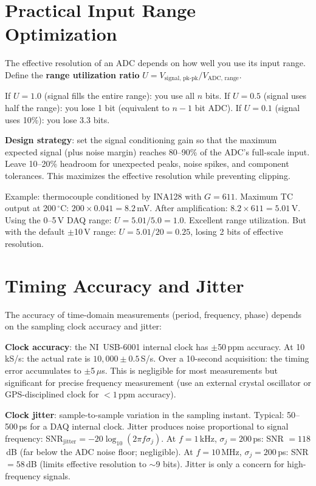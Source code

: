 \documentclass[11pt,letterpaper,twoside,openany]{book}
\newcommand{\degC}{\ensuremath{{}^{\circ}\text{C}}}
\begin{document}
\section{Practical Input Range Optimization}
The effective resolution of an ADC depends on how well you use its input range. Define the \textbf{range utilization ratio} $U = V_{\text{signal, pk-pk}} / V_{\text{ADC, range}}$.

If $U = 1.0$ (signal fills the entire range): you use all $n$ bits. If $U = 0.5$ (signal uses half the range): you lose 1 bit (equivalent to $n-1$ bit ADC). If $U = 0.1$ (signal uses 10\%): you lose 3.3 bits.

\textbf{Design strategy}: set the signal conditioning gain so that the maximum expected signal (plus noise margin) reaches 80--90\% of the ADC's full-scale input. Leave 10--20\% headroom for unexpected peaks, noise spikes, and component tolerances. This maximizes the effective resolution while preventing clipping.

Example: thermocouple conditioned by INA128 with $G = 611$. Maximum TC output at 200\,\degC{}: $200 \times 0.041 = 8.2$\,mV. After amplification: $8.2 \times 611 = 5.01$\,V. Using the 0--5\,V DAQ range: $U = 5.01/5.0 = 1.0$. Excellent range utilization. But with the default $\pm$10\,V range: $U = 5.01/20 = 0.25$, losing 2 bits of effective resolution.

\section{Timing Accuracy and Jitter}
The accuracy of time-domain measurements (period, frequency, phase) depends on the sampling clock accuracy and jitter:

\textbf{Clock accuracy}: the NI~USB-6001 internal clock has $\pm$50\,ppm accuracy. At 10\,kS/s: the actual rate is $10{,}000 \pm 0.5$\,S/s. Over a 10-second acquisition: the timing error accumulates to $\pm$5\,$\mu$s. This is negligible for most measurements but significant for precise frequency measurement (use an external crystal oscillator or GPS-disciplined clock for $< 1$\,ppm accuracy).

\textbf{Clock jitter}: sample-to-sample variation in the sampling instant. Typical: 50--500\,ps for a DAQ internal clock. Jitter produces noise proportional to signal frequency: SNR$_{\text{jitter}} = -20\log_{10}(2\pi f \sigma_j)$. At $f = 1$\,kHz, $\sigma_j = 200$\,ps: SNR $= 118$\,dB (far below the ADC noise floor; negligible). At $f = 10$\,MHz, $\sigma_j = 200$\,ps: SNR $= 58$\,dB (limits effective resolution to $\sim$9 bits). Jitter is only a concern for high-frequency signals.
\end{document}
